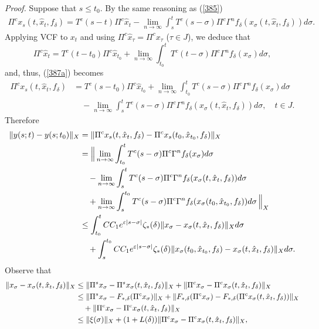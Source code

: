 \documentclass[12pt]{amsart}
\begin{document}
\noindent
{\it Proof.} Suppose that $s\leq t_0$. By the same reasoning as (\ref{385}) 
\begin{align}\label{387a}
   \Pi^cx_s(t,\hat x_t,f_\delta)
   = T^c(s-t)\Pi^c\hat x_t-\lim_{n\to\infty}\int_s^t 
     T^c(s-\sigma)\Pi^c\Gamma ^nf_\delta(x_\sigma(t,\hat x_t,f_\delta))d\sigma.
     \quad 
\end{align}
Applying VCF to $x_t$ and using $\Pi^c\hat x_\tau=\Pi^c x_\tau$ 
($\tau\in J$), we deduce that
$$
   \Pi^c \hat x_t=T^c(t-t_0)\Pi^c \hat x_{t_0}+\lim_{n\to\infty} 
   \int_{t_0}^t T^c(t-\sigma)\Pi^c\Gamma ^nf_\delta(x_\sigma)d\sigma, 
$$
and, thus, (\ref{387a}) becomes 
\begin{align*}
   \Pi^cx_s(t,\hat x_t,f_\delta)
   &= T^c(s-t_0)\Pi^c\hat x_{t_0} + \lim_{n\to\infty}\int_{t_0}^t 
      T^c(s-\sigma)\Pi^c\Gamma ^nf_\delta(x_\sigma)d\sigma \\
   &\quad -\lim_{n\to\infty}\int_s^{t} 
      T^c(s-\sigma)\Pi^c\Gamma ^nf_\delta(x_\sigma(t,\hat x_t,f_\delta))d\sigma, \quad t\in J. 
\end{align*}
Therefore
\begin{align}\label{387} 
   \|y(s;t)-y(s;t_0)\|_X 
   &= \|\Pi^c x_s(t,\hat x_t,f_\delta)- \Pi^cx_s(t_0,\hat x_{t_0},f_\delta) \|_X \notag \\
   &= \Big\| \lim_{n\to\infty}\int_{t_0}^t T^c(s-\sigma)\Pi^c\Gamma ^nf_\delta(x_\sigma)d\sigma \notag \\
   &\quad -\lim_{n\to\infty}\int_s^{t} T^c(s-\sigma)\Pi^c\Gamma ^nf_\delta(x_\sigma(t,\hat x_t,f_\delta))d\sigma \notag \\
   &\quad +\lim_{n\to\infty}\int_s^{t_0} T^c(s-\sigma)\Pi^c\Gamma ^nf_\delta(x_\sigma(t_0,\hat x_{t_0},f_\delta))d\sigma\,\Big\|_X \notag \\
   &\leq \int_{t_0}^t CC_1 e^{\varepsilon |s-\sigma|} \zeta_\ast(\delta)
                \| x_\sigma-x_\sigma(t,\hat x_t,f_\delta)\|_X d\sigma \notag \\
   &\quad +\int_s^{t_0} CC_1 e^{\varepsilon |s-\sigma|} \zeta_\ast(\delta)
                \|x_\sigma(t_0,\hat x_{t_0},f_\delta)  -x_\sigma(t,\hat x_t,f_\delta)\|_X d\sigma. 
\end{align}
Observe that
\begin{align}\label{390}
   \|x_\sigma-x_\sigma(t,\hat x_t,f_\delta)\|_X 
   &\leq \|\Pi^s x_\sigma- \Pi^s x_\sigma(t,\hat x_t,f_\delta)\|_X 
         + \|\Pi^c x_\sigma- \Pi^c x_\sigma(t,\hat x_t,f_\delta)\|_X \notag \\
   &\leq \|\Pi^s x_\sigma- F_{\ast,\delta}(\Pi^cx_\sigma)\|_X 
         + \|F_{\ast,\delta}(\Pi^cx_\sigma) -F_{\ast,\delta}(\Pi^c x_\sigma(t,\hat x_t,f_\delta))\|_X \notag \\
   &\quad +\|\Pi^c x_\sigma- \Pi^c x_\sigma(t,\hat x_t,f_\delta)\|_X \notag \\
   &\leq \|\xi(\sigma)\|_X+ (1+L(\delta))  \|\Pi^c x_\sigma- \Pi^c x_\sigma(t,\hat x_t,f_\delta)\|_X, 
\end{align}
\end{document}
